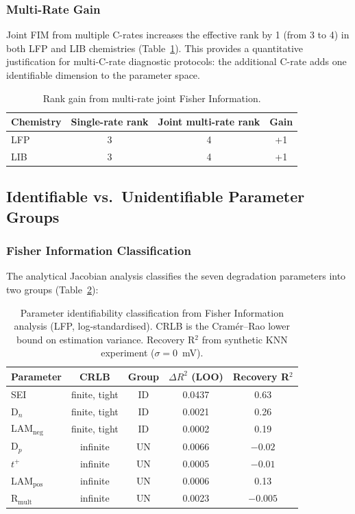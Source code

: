 \documentclass[preprint,12pt]{elsarticle}
\begin{document}
\subsubsection{Multi-Rate Gain}

Joint FIM from multiple C-rates increases the effective rank by 1 (from 3 to 4) in both LFP and LIB chemistries (Table~\ref{tab:multirate}).
This provides a quantitative justification for multi-C-rate diagnostic protocols: the additional C-rate adds one identifiable dimension to the parameter space.

\begin{table}[htbp]
\centering
\caption{Rank gain from multi-rate joint Fisher Information.}
\label{tab:multirate}
\begin{tabular}{lccc}
\toprule
Chemistry & Single-rate rank & Joint multi-rate rank & Gain \\
\midrule
LFP & 3 & 4 & +1 \\
LIB & 3 & 4 & +1 \\
\bottomrule
\end{tabular}
\end{table}

\subsection{Identifiable vs.\ Unidentifiable Parameter Groups}
\label{sec:id_un}

\subsubsection{Fisher Information Classification}

The analytical Jacobian analysis classifies the seven degradation parameters into two groups (Table~\ref{tab:groups}):

\begin{table}[htbp]
\centering
\caption{Parameter identifiability classification from Fisher Information analysis (LFP, log-standardised). CRLB is the Cram\'er--Rao lower bound on estimation variance. Recovery R$^2$ from synthetic KNN experiment ($\sigma = 0$~mV).}
\label{tab:groups}
\begin{tabular}{lcccc}
\toprule
Parameter & CRLB & Group & $\Delta R^2$ (LOO) & Recovery R$^2$ \\
\midrule
SEI & finite, tight & ID & 0.0437 & 0.63 \\
D$_n$ & finite, tight & ID & 0.0021 & 0.26 \\
LAM$_{\mathrm{neg}}$ & finite, tight & ID & 0.0002 & 0.19 \\
\midrule
D$_p$ & infinite & UN & 0.0066 & $-0.02$ \\
$t^+$ & infinite & UN & 0.0005 & $-0.01$ \\
LAM$_{\mathrm{pos}}$ & infinite & UN & 0.0006 & 0.13 \\
R$_{\mathrm{mult}}$ & infinite & UN & 0.0023 & $-0.005$ \\
\bottomrule
\end{tabular}
\end{table}
\end{document}
